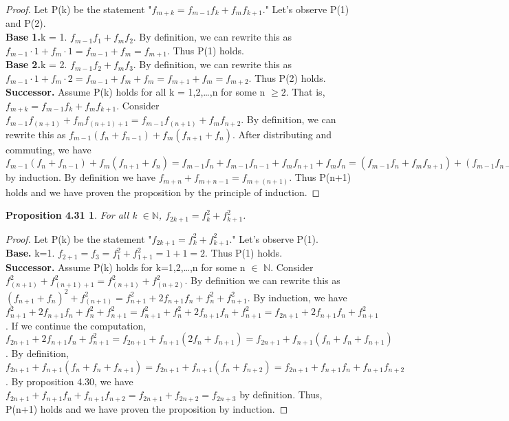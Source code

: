 \documentclass[12pt]{amsart}
\newcommand{\N}{\mathbb{N}}
\begin{document}
\begin{proof}
	Let P(k) be the statement "$f_{m+k} = f_{m-1}f_{k} + f_mf_{k+1}$." Let's observe P(1) and P(2).
	\\\textbf{Base 1.}k = 1. $f_{m-1}f_{1} + f_mf_{2}$. By definition, we can rewrite this as $f_{m-1} \cdot 1 + f_m \cdot 1 = f_{m-1} + f_{m} = f_{m+1}$. Thus P(1) holds.
	\\\textbf{Base 2.}k = 2. $f_{m-1}f_{2} + f_mf_{3}$. By definition, we can rewrite this as $f_{m-1} \cdot 1 + f_m \cdot 2 = f_{m-1} + f_{m} + f_{m} = f_{m+1} + f_{m} = f_{m+2}$. Thus P(2) holds.
	\\\textbf{Successor.} Assume P(k) holds for all k = 1,2,\dots,n for some n $\geq 2$. That is,$f_{m+k} = f_{m-1}f_{k} + f_mf_{k+1}$. Consider \\$f_{m-1}f_{(n+1)} + f_mf_{(n+1)+1} = f_{m-1}f_{(n+1)} + f_mf_{n+2}$. By definition, we can rewrite this as $f_{m-1}(f_{n} + f_{n-1}) + f_m(f_{n+1} + f_{n})$. After distributing and commuting, we have $f_{m-1}(f_{n} + f_{n-1}) + f_m(f_{n+1} + f_{n}) = f_{m-1}f_{n} + f_{m-1}f_{n-1} + f_mf_{n+1} + f_mf_{n} = (f_{m-1}f_{n} + f_mf_{n+1}) + (f_{m-1}f_{n-1} + f_mf_{n}) = f_{m+n} + f_{m+n-1}$ by induction. By definition we have $f_{m+n} + f_{m+n-1} = f_{m+(n+1)}$. Thus P(n+1) holds and we have proven the proposition by the principle of induction.
\end{proof}

\newtheorem*{prop4.31}{Proposition 4.31}
\begin{prop4.31}
	For all k $\in \N$, $f_{2k+1} = f_k^2 + f_{k+1}^2$.
\end{prop4.31}

\begin{proof}
	Let P(k) be the statement "$f_{2k+1} = f_k^2 + f_{k+1}^2$." Let's observe P(1).
	\\\textbf{Base.} k=1. $f_{2+1} = f_{3} =f_1^2 + f_{1+1}^2 = 1 + 1 = 2$. Thus P(1) holds.
	\\\textbf{Successor.} Assume P(k) holds for k=1,2,\dots,n for some n $\in$ $\N$. Consider $f_{(n+1)}^2 + f_{(n+1)+1}^2 = f_{(n+1)}^2 + f_{(n+2)}^2$. By definition we can rewrite this as $(f_{n+1} + f_{n})^2 + f_{(n+1)}^2 = f_{n+1}^{2} + 2f_{n+1}f_{n} + f_{n}^{2} + f_{n+1}^2$. By induction, we have $f_{n+1}^{2} + 2f_{n+1}f_{n} + f_{n}^{2} + f_{n+1}^2 = f_{n+1}^{2} + f_{n}^{2} + 2f_{n+1}f_{n} + f_{n+1}^2 = f_{2n+1} + 2f_{n+1}f_{n} + f_{n+1}^2$. If we continue the computation, $f_{2n+1} + 2f_{n+1}f_{n} + f_{n+1}^2 = f_{2n+1} + f_{n+1}(2f_{n} + f_{n+1}) = f_{2n+1} + f_{n+1}(f_{n} + f_{n} + f_{n+1})$. By definition, $f_{2n+1} + f_{n+1}(f_{n} + f_{n} + f_{n+1}) = f_{2n+1} + f_{n+1}(f_{n} + f_{n+2}) = f_{2n+1} + f_{n+1}f_{n} + f_{n+1}f_{n+2}$. By proposition 4.30, we have $f_{2n+1} + f_{n+1}f_{n} + f_{n+1}f_{n+2} = f_{2n+1} + f_{2n+2} = f_{2n+3}$ by definition. Thus, P(n+1) holds and we have proven the proposition by induction.
\end{proof}
\end{document}
